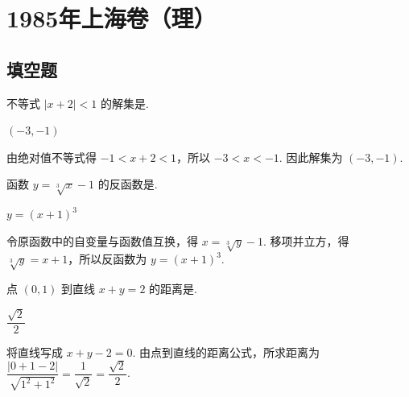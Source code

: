 \documentclass[UTF8,a4paper,oneside,11pt]{ctexbook}
\begin{document}
\mainmatter

\chapter{1985年上海卷（理）}

\section{填空题}

\begin{problem}

不等式 \(\left|x+2\right|<1\) 的解集是\fillinblank{}.

\begin{answer}
\(\left(-3,-1\right)\)
\end{answer}
\end{problem}

\begin{solution}
由绝对值不等式得 \(-1<x+2<1\)，所以 \(-3<x<-1\). 因此解集为 \(\left(-3,-1\right)\).
\end{solution}

\begin{problem}

函数 \(y=\sqrt[3]{x}-1\) 的反函数是\fillinblank{}.

\begin{answer}
\(y=\left(x+1\right)^3\)
\end{answer}
\end{problem}

\begin{solution}
令原函数中的自变量与函数值互换，得 \(x=\sqrt[3]{y}-1\). 移项并立方，得 \(\sqrt[3]{y}=x+1\)，所以反函数为 \(y=\left(x+1\right)^3\).
\end{solution}

\begin{problem}

点 \((0,1)\) 到直线 \(x+y=2\) 的距离是\fillinblank{}.

\begin{answer}
\(\dfrac{\sqrt{2}}{2}\)
\end{answer}
\end{problem}

\begin{solution}
将直线写成 \(x+y-2=0\). 由点到直线的距离公式，所求距离为
\(\dfrac{\left|0+1-2\right|}{\sqrt{1^2+1^2}}=\dfrac{1}{\sqrt{2}}=\dfrac{\sqrt{2}}{2}\).
\end{solution}
\end{document}
